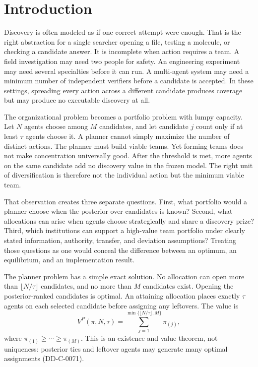 \documentclass[11pt]{article}
\begin{document}


\section{Introduction}

Discovery is often modeled as if one correct attempt were enough. That is the
right abstraction for a single searcher opening a file, testing a molecule, or
checking a candidate answer. It is incomplete when action requires a team. A
field investigation may need two people for safety. An engineering experiment
may need several specialties before it can run. A multi-agent system may need a
minimum number of independent verifiers before a candidate is accepted. In
these settings, spreading every action across a different candidate produces
coverage but may produce no executable discovery at all.

The organizational problem becomes a portfolio problem with lumpy capacity.
Let $N$ agents choose among $M$ candidates, and let candidate $j$ count only if
at least $\tau$ agents choose it. A planner cannot simply maximize the number of
distinct actions. The planner must build viable teams. Yet forming teams does
not make concentration universally good. After the threshold is met, more
agents on the same candidate add no discovery value in the frozen model. The
right unit of diversification is therefore not the individual action but the
minimum viable team.

That observation creates three separate questions. First, what portfolio would
a planner choose when the posterior over candidates is known? Second, what
allocations can arise when agents choose strategically and share a discovery
prize? Third, which institutions can support a high-value team portfolio under
clearly stated information, authority, transfer, and deviation assumptions?
Treating those questions as one would conceal the difference between an
optimum, an equilibrium, and an implementation result.

The planner problem has a simple exact solution. No allocation can open more
than $\lfloor N/\tau\rfloor$ candidates, and no more than $M$ candidates exist.
Opening the posterior-ranked candidates is optimal. An attaining allocation
places exactly $\tau$ agents on each selected candidate before assigning any
leftovers. The value is
\begin{equation}
 V^{P}(\pi,N,\tau)=\sum_{j=1}^{\min\{\lfloor N/\tau\rfloor,M\}}\pi_{(j)},
 \label{eq:planner}
\end{equation}
where $\pi_{(1)}\geq\cdots\geq\pi_{(M)}$. This is an existence and value
theorem, not uniqueness: posterior ties and leftover agents may generate many
optimal assignments (DD-C-0071).
\end{document}
